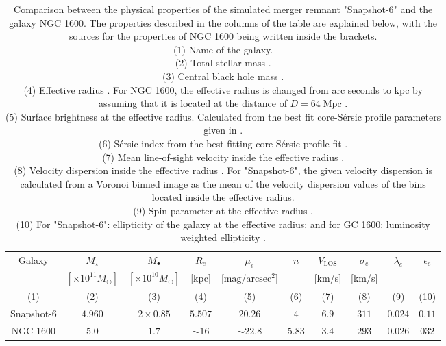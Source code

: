 \documentclass[english, oneside]{HYgradu}
\begin{document}
\begin{table}
	\begin{center}
		\scriptsize
		\begin{tabular}{c c c c c c c c c c}
		\hline
		\hline
		Galaxy & $M_\star$ & $M_\bullet$ & $R_e$ & $\mu_e$ & $n$ & 
		$V_\mathrm{LOS}$ & $\sigma_e$ & $\lambda_e$ &
		$\epsilon_e$ \\
		& $[\times 10^{11} M_\odot]$ & $[\times 10^{10} M_\odot]$ &
		[kpc] & [$\mathrm{mag/arcsec^2}$] & & [km/s] & [km/s] & & \\
		(1) & (2) & (3) & (4) & (5) & (6) & (7) & (8) & (9) & (10) \\
		\hline
		Snapshot-6 & $4.960$ & $2 \times 0.85$ & $5.507$ & $20.26$ & $4$ & $6.9$ & $311$ & $0.024$ & $0.11$ \\
		NGC 1600 & $5.0$ & $1.7$ & $\sim 16$ & $\sim 22.8$ & $5.83$ & $3.4$ & 
		$293$ & $0.026$ & $032$ \\
		\hline
		\end{tabular}
	\end{center}
	\caption{Comparison between the physical properties of the simulated merger remnant "Snapshot-6" and the galaxy NGC 1600. The properties described in the columns of the table are explained below, with the sources for the properties of NGC 1600 being written inside the brackets. \\
	(1) Name of the galaxy. \\
	(2) Total stellar mass \citep{Thomas2016}. \\
	(3) Central black hole mass \citep{Thomas2016}. \\
	(4) Effective radius \citep{Thomas2016}. For NGC 1600, the effective radius is changed from arc seconds to kpc by assuming that it is located at the distance of $D = 64 \; \mathrm{Mpc}$ \citep{Thomas2016}. \\
	(5) Surface brightness at the effective radius. Calculated from the best fit core-Sérsic profile parameters given in \cite{Thomas2016}. \\
	(6) Sérsic index from the best fitting core-Sérsic profile fit \citep{Thomas2016}. \\
	(7) Mean line-of-sight velocity inside the effective radius \citep{Bender1994}. \\
	(8) Velocity dispersion inside the effective radius \citep{Veale2017veldisp}. For "Snapshot-6", the given velocity dispersion is calculated from a Voronoi binned image as the mean of the velocity dispersion values of the bins located inside the effective radius. \\
	(9) Spin parameter at the effective radius \citep{Veale2018lambda}. \\
	(10) For "Snapshot-6": ellipticity of the galaxy at the effective radius; and for GC 1600: luminosity weighted ellipticity \citep{Goullaud2018}.
	}
	\label{table:snap6_vs_NGC1600}
\end{table}
\end{document}
